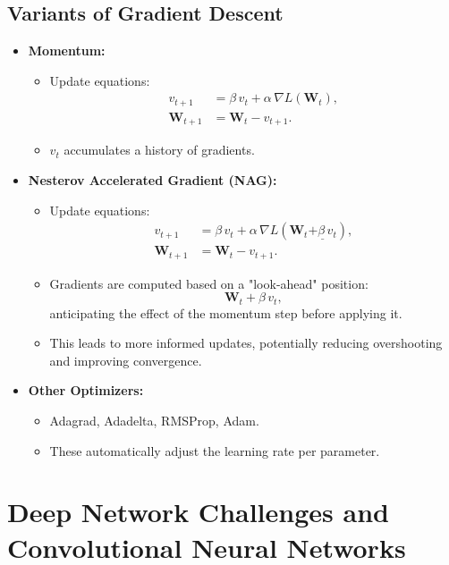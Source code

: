 \documentclass{article}
\begin{document}
\subsection{Variants of Gradient Descent}

 \begin{itemize}
    \item \textbf{Momentum:}
    \begin{itemize}
        \item Update equations:
        \[
        \begin{aligned}
        v_{t+1} &= \beta\, v_{t} + \alpha\, \nabla L(\mathbf{W}_t),\\[1mm]
        \mathbf{W}_{t+1} &= \mathbf{W}_t - v_{t+1}.
        \end{aligned}
        \]
        \item \(v_t\) accumulates a history of gradients.
    \end{itemize}
    \item \textbf{Nesterov Accelerated Gradient (NAG):}
        \begin{itemize}
            \item Update equations:
            \[
            \begin{aligned}
            v_{t+1} &= \beta\, v_t + \alpha\, \nabla L(\mathbf{W}_t \underline{+ \beta\, v_t}),\\[1mm]
            \mathbf{W}_{t+1} &= \mathbf{W}_t - v_{t+1}.
            \end{aligned}
            \]
            \item Gradients are computed based on a "look-ahead" position:
            \[
            \mathbf{W}_t + \beta\, v_t,
            \]
            anticipating the effect of the momentum step before applying it.
            \item This leads to more informed updates, potentially reducing overshooting and improving convergence.
        \end{itemize}
    \item \textbf{Other Optimizers:} 
    \begin{itemize}
        \item Adagrad, Adadelta, RMSProp, Adam.
        \item These automatically adjust the learning rate per parameter.
    \end{itemize}
\end{itemize}

\section{Deep Network Challenges and Convolutional Neural Networks}
\end{document}

